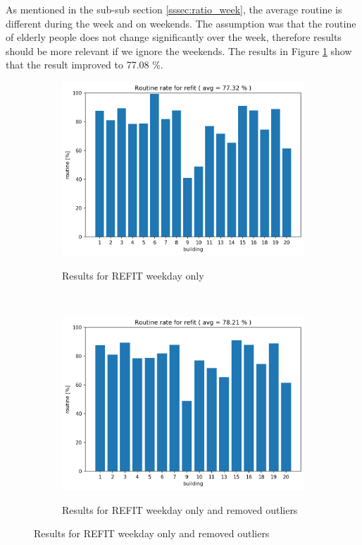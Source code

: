 As mentioned in the sub-sub section \ref{sssec:ratio_week}, the average routine is different during the week and on weekends.
The assumption was that the routine of elderly people does not change significantly over the week, therefore results should be more relevant if we ignore the weekends.
The results in Figure \ref{fig:refit_res_nw_1} show that the result improved to 77.08 \%.

\begin{figure}[H]
	\begin{subfigure}{.5\textwidth}
	\caption{Results for REFIT weekday only}
	\includegraphics[width=1\textwidth]{Figures/EC/refit_res_nw_1.png}
	\label{fig:refit_res_nw_1}
    \end{subfigure}
    ~
    \begin{subfigure}{.5\textwidth}
	\caption{Results for REFIT weekday only and removed outliers}
	\includegraphics[width=1\textwidth]{Figures/EC/refit_res_nw_2.png}
	\label{fig:refit_res_nw_2}
    \end{subfigure}
\end{figure}


